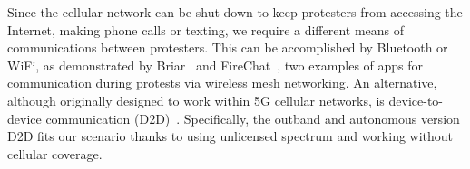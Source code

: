 
Since the cellular network can be shut down to keep protesters from accessing the Internet, making phone calls or texting, we require a different means of communications between protesters. 
This can be accomplished by Bluetooth or WiFi, as demonstrated by Briar~\cite{Briar} and FireChat~\cite{FireChat}, two examples of apps for communication during protests via wireless mesh networking. 
An alternative, although originally designed to work within 5G cellular networks, is device-to-device communication (D2D)~\cite{D2D}. 
Specifically, the outband and autonomous version D2D fits our scenario thanks to using
unlicensed spectrum and working without cellular coverage.